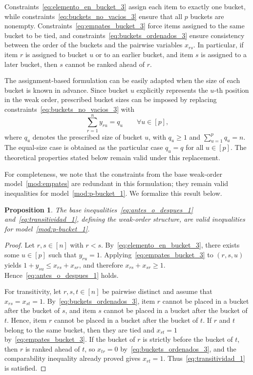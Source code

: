 \documentclass[pdflatex,basic,Numbered]{jnl}%
\theoremstyle{plain}
\newtheorem{prop}{Proposition}
\theoremstyle{remark}
\theoremstyle{thmstyleone}%
\theoremstyle{thmstylethree}%
\begin{document}
Constraints~\eqref{eq:elemento_en_bucket_3} assign each item to exactly one bucket, while constraints~\eqref{eq:buckets_no_vacios_3} ensure that all \(p\) buckets are nonempty. Constraints~\eqref{eq:empates_bucket_3} force items assigned to the same bucket to be tied, and constraints~\eqref{eq:buckets_ordenados_3} ensure consistency between the order of the buckets and the pairwise variables \(x_{rs}\). In particular, if item \(r\) is assigned to bucket \(u\) or to an earlier bucket, and item \(s\) is assigned to a later bucket, then \(s\) cannot be ranked ahead of \(r\).

The assignment-based formulation can be easily adapted when the size of each bucket is known in advance. Since bucket \(u\) explicitly represents the \(u\)-th position in the weak order, prescribed bucket sizes can be imposed by replacing constraints~\eqref{eq:buckets_no_vacios_3} with
\begin{equation}\label{eq:prescribed_bucket_sizes_assignment}
    \sum_{r=1}^n y_{ru}=q_u
    \qquad \forall u\in[p],
\end{equation}
where \(q_u\) denotes the prescribed size of bucket \(u\), with \(q_u\ge 1\) and \(\sum_{u=1}^p q_u=n\). The equal-size case is obtained as the particular case \(q_u=q\) for all \(u\in[p]\). The theoretical properties stated below remain valid under this replacement.

For completeness, we note that the constraints from the base weak-order model~\eqref{mod:empates} are redundant in this formulation; they remain valid inequalities for model~\eqref{mod:p-bucket_1}. We formalize this result below.

\begin{prop}\label{prop:des_valida_1}
The base inequalities~\eqref{eq:antes_o_despues_1} and~\eqref{eq:transitividad_1}, defining the weak-order structure, are valid inequalities for model~\eqref{mod:p-bucket_1}.
\end{prop}

\begin{proof}
Let \(r,s\in[n]\) with \(r<s\). By~\eqref{eq:elemento_en_bucket_3}, there exists some \(u\in[p]\) such that \(y_{ru}=1\). Applying~\eqref{eq:empates_bucket_3} to \((r,s,u)\) yields \(1+y_{su}\le x_{rs}+x_{sr}\), and therefore \(x_{rs}+x_{sr}\ge 1\). Hence~\eqref{eq:antes_o_despues_1} holds.

For transitivity, let \(r,s,t\in[n]\) be pairwise distinct and assume that \(x_{rs}=x_{st}=1\). By~\eqref{eq:buckets_ordenados_3}, item \(r\) cannot be placed in a bucket after the bucket of \(s\), and item \(s\) cannot be placed in a bucket after the bucket of \(t\). Hence, item \(r\) cannot be placed in a bucket after the bucket of \(t\). If \(r\) and \(t\) belong to the same bucket, then they are tied and \(x_{rt}=1\) by~\eqref{eq:empates_bucket_3}. If the bucket of \(r\) is strictly before the bucket of \(t\), then \(r\) is ranked ahead of \(t\), so \(x_{tr}=0\) by~\eqref{eq:buckets_ordenados_3}, and the comparability inequality already proved gives \(x_{rt}=1\). Thus~\eqref{eq:transitividad_1} is satisfied.
\end{proof}
\end{document}

